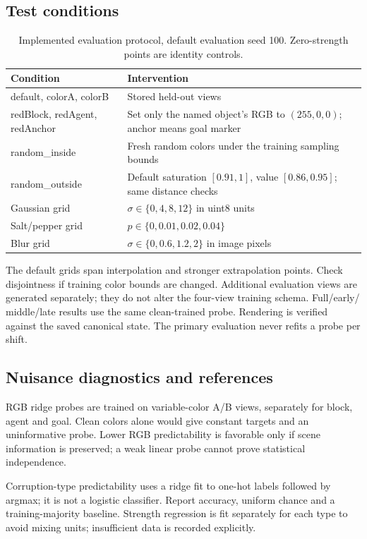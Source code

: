 \documentclass[11pt,a4paper]{article}
\begin{document}
\subsection{Test conditions}
\begin{table}[htbp]\centering\small
\begin{tabularx}{\linewidth}{lX}
\toprule Condition & Intervention \\\midrule
default, colorA, colorB & Stored held-out views \\
redBlock, redAgent, redAnchor & Set only the named object's RGB to $(255,0,0)$; anchor means goal marker \\
random\_inside & Fresh random colors under the training sampling bounds \\
random\_outside & Default saturation $[0.91,1]$, value $[0.86,0.95]$; same distance checks \\
Gaussian grid & $\sigma\in\{0,4,8,12\}$ in uint8 units \\
Salt/pepper grid & $p\in\{0,0.01,0.02,0.04\}$ \\
Blur grid & $\sigma\in\{0,0.6,1.2,2\}$ in image pixels \\\bottomrule
\end{tabularx}
\caption{Implemented evaluation protocol, default evaluation seed 100. Zero-strength points are identity controls.}
\end{table}
The default grids span interpolation and stronger extrapolation points. Check
disjointness if training color bounds are changed. Additional evaluation views are
generated separately; they do not alter the four-view training schema. Full/early/
middle/late results use the same clean-trained probe. Rendering is verified against
the saved canonical state. The primary evaluation never refits a probe per shift.

\subsection{Nuisance diagnostics and references}
RGB ridge probes are trained on variable-color A/B views, separately for block,
agent and goal. Clean colors alone would give constant targets and an uninformative
probe. Lower RGB predictability is favorable only if scene information is preserved;
a weak linear probe cannot prove statistical independence.

Corruption-type predictability uses a ridge fit to one-hot labels followed by argmax;
it is not a logistic classifier. Report accuracy, uniform chance and a training-majority
baseline. Strength regression is fit separately for each type to avoid mixing units;
insufficient data is recorded explicitly.
\end{document}
